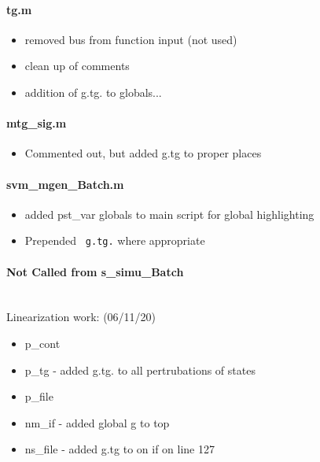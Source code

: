 \documentclass[12pt]{article}
\begin{document}
\paragraph{tg.m}
	\begin{itemize}
		\item removed bus from function input (not used)
		\item clean up of comments
		\item addition of g.tg. to globals...
	\end{itemize}

\paragraph{mtg\_sig.m}
	\begin{itemize}
		\item Commented out, but added g.tg to proper places
	\end{itemize}

\paragraph{svm\_mgen\_Batch.m}
	\begin{itemize}
		\item added pst\_var globals to main script for global highlighting
		\item Prepended \verb| g.tg.| where appropriate
	\end{itemize}


\paragraph{Not Called from s\_simu\_Batch } \ \\
Linearization work: (06/11/20)
	\begin{itemize}
		\item p\_cont
		\item p\_tg - added g.tg. to all pertrubations of states
		\item p\_file
		\item nm\_if - added global g to top
		\item ns\_file - added g.tg to on if on line 127
	\end{itemize}
\end{document}
